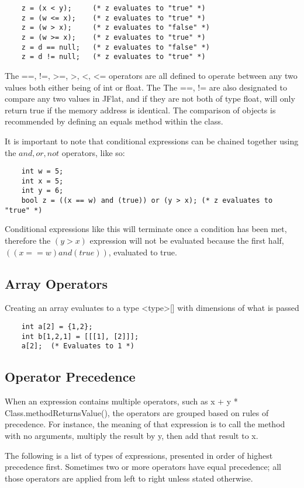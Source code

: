 \begin{homeworkProblem}
\begin{verbatim}
	z = (x < y);     (* z evaluates to "true" *)
	z = (w <= x);    (* z evaluates to "true" *)
	z = (w > x);     (* z evaluates to "false" *)
	z = (w >= x);    (* z evaluates to "true" *)
	z = d == null;	 (* z evaluates to "false" *)
	z = d != null;   (* z evaluates to "true" *)
	\end{verbatim}
	
	The ==, !=, \textgreater=, \textgreater, \textless, \textless= operators are all defined to operate between any two values both either being of int or float. The The ==, != are also designated to compare any two values in JFlat, and if they are not both of type float, will only return true if the memory address is identical. The comparison of objects is recommended by defining an equals method within the class. 
	
	It is important to note that conditional expressions can be chained together using the $and, or, not$ operators, like so:
	\begin{verbatim}
	int w = 5;
	int x = 5;
	int y = 6;
	bool z = ((x == w) and (true)) or (y > x); (* z evaluates to "true" *)
	\end{verbatim}
	
	Conditional expressions like this will terminate once a condition has been met, therefore the $(y>x)$ expression will not be evaluated because the first half, $((x == w) and (true))$, evaluated to true.
	
	\subsection{Array Operators}
	Creating an array evaluates to a type \textless type\textgreater[] with dimensions of what is passed
	\begin{verbatim}
	int a[2] = {1,2};
	int b[1,2,1] = [[[1], [2]]];
	a[2];  (* Evaluates to 1 *)
	\end{verbatim}
	
	\subsection{Operator Precedence}
	
	When an expression contains multiple operators, such as x + y * Class.methodReturnsValue(), the operators are grouped based on rules of precedence. For instance, the meaning of that expression is to call the method with no arguments, multiply the result by y, then add that result to x. 
	
	The following is a list of types of expressions, presented in order of highest precedence first. Sometimes two or more operators have equal precedence; all those operators are applied from left to right unless stated otherwise.
	

\end{homeworkProblem}
